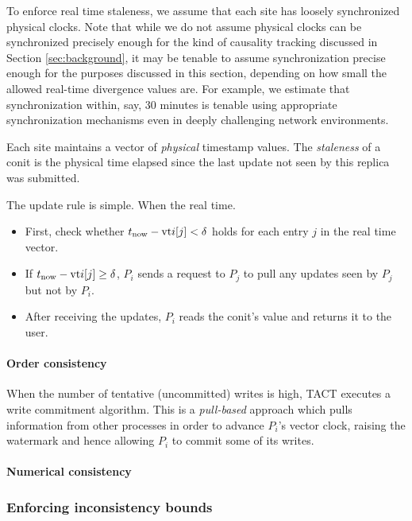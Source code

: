 \documentclass[]             %
{NASA}                       %
\theoremstyle{definition}
\begin{document}
To enforce real time staleness, we assume that each site has loosely
synchronized physical clocks. Note that while we do not assume
physical clocks can be synchronized precisely enough for the kind of
causality tracking discussed in Section \ref{sec:background}, it may
be tenable to assume synchronization precise enough for the purposes
discussed in this section, depending on how small the allowed
real-time divergence values are. For example, we estimate that
synchronization within, say, 30 minutes is tenable using appropriate
synchronization mechanisms even in deeply challenging network
environments.

Each site maintains a vector of \emph{physical} timestamp values. The
\emph{staleness} of a conit is the physical time elapsed since the
last update not seen by this replica was submitted.

The update rule is simple. When the real time.

\newcommand{\vtphys}[2]{\mathrm{vt}_{#1}}
\begin{itemize}
\item First, check whether $t_{\mathrm{now}} - \textrm{vt}{i}[j] < \delta$
  holds for each entry $j$ in the real time vector.
\item If $t_{\mathrm{now}} - \textrm{vt}{i}[j] \geq \delta$, $P_i$ sends a
  request to $P_j$ to pull any updates seen by $P_j$ but not by $P_i$.
\item After receiving the updates, $P_i$ reads the conit's value and
  returns it to the user.
\end{itemize}

\paragraph{Order consistency}
\label{order-consistency}
When the number of tentative (uncommitted) writes is high, TACT
executes a write commitment algorithm. This is a \emph{pull-based}
approach which pulls information from other processes in order to
advance \(P_i\)'s vector clock, raising the watermark and hence
allowing \(P_i\) to commit some of its writes.

\paragraph{Numerical consistency}
\label{numerical-consistency}

\subsubsection{Enforcing inconsistency bounds}
\label{enforcing-inconsistency-bounds}
\end{document}
